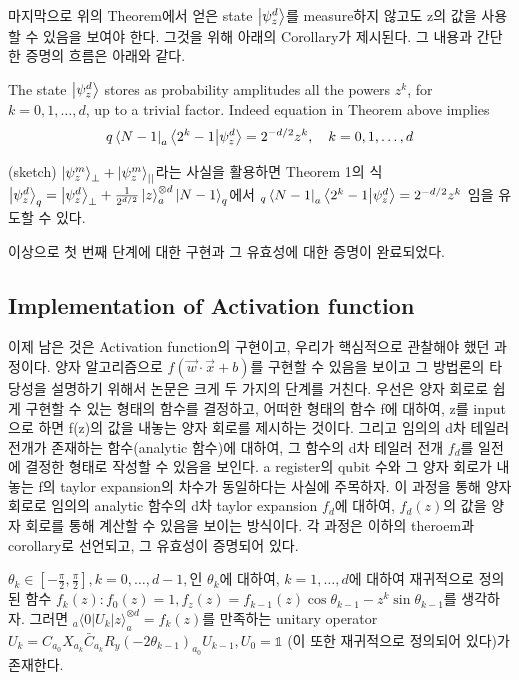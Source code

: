 마지막으로 위의 Theorem에서 얻은 state \(\ket{\psi_z^d}\)를 measure하지 않고도 z의 값을 사용할 수 있음을 보여야 한다.
그것을 위해 아래의 Corollary가 제시된다. 그 내용과 간단한 증명의 흐름은 아래와 같다.

\begin{corollary}
    The state $\ket{\psi_z^d}$ stores as probability amplitudes all the powers $z^k$, for $k = 0, 1, \ldots, d$, up to a trivial factor. Indeed equation in Theorem above implies
\[
q \bra{N - 1}_a \bra{2^k - 1} \ket{\psi_z^d} = 2^{-d/2} z^k, \quad k = 0, 1, \ldots, d
\]
\end{corollary}

\begin{pf}(sketch)
    \(\ket{\psi_z^m}_\perp + \ket{\psi_z^m}_{||}\)라는 사실을 활용하면
    Theorem 1의 식 \(\ket{\psi_z^d}_q = \ket{\psi_z^d}_\perp + \frac{1}{2^{d/2}}\ket{z}_a^{\otimes d}\ket{N-1}_q\)에서 \(_q\bra{N-1}_a\bra{2^k-1}\ket{\psi_z^d} = 2^{-d/2}z^k\) 임을 유도할 수 있다.
\end{pf}

이상으로 첫 번째 단계에 대한 구현과 그 유효성에 대한 증명이 완료되었다.

\subsection{Implementation of Activation function}

이제 남은 것은 Activation function의 구현이고, 우리가 핵심적으로 관찰해야 했던 과정이다.
양자 알고리즘으로 \(f(\vec{w}\cdot\vec{x}+b)\)를 구현할 수 있음을 보이고 그 방법론의 타당성을 설명하기 위해서 논문은 크게 두 가지의 단계를 거친다.
우선은 양자 회로로 쉽게 구현할 수 있는 형태의 함수를 결정하고,
어떠한 형태의 함수 f에 대하여, z를 input으로 하면 f(z)의 값을 내놓는 양자 회로를 제시하는 것이다.
그리고 임의의 d차 테일러 전개가 존재하는 함수(analytic 함수)에 대하여, 그 함수의 d차 테일러 전개 \(f_d\)를 일전에 결정한 형태로 작성할 수 있음을 보인다.
a register의 qubit 수와 그 양자 회로가 내놓는 f의 taylor expansion의 차수가 동일하다는 사실에 주목하자.
이 과정을 통해 양자 회로로 임의의 analytic 함수의 d차 taylor expansion \(f_d\)에 대하여, \(f_d(z)\)의 값을 양자 회로를 통해 계산할 수 있음을 보이는 방식이다.
각 과정은 이하의 theroem과 corollary로 선언되고, 그 유효성이 증명되어 있다.

\begin{theorem}
    \(\theta_{k} \in [-\frac{\pi}{2},\frac{\pi}{2}], k = 0,\dots,d-1,\)인 \(\theta_{k}\)에 대하여, \(k = 1,\dots,d\)에 대하여 재귀적으로 정의된 함수 \(f_k(z): f_0(z) = 1, f_z(z) = f_{k-1}(z)\cos\theta_{k-1} - z^k\sin\theta_{k-1}\)를 생각하자.
    그러면 \(_a \langle  0|U_k|z \rangle  _a^{\otimes d} = f_k(z)\)를 만족하는 unitary operator \(U_k = C_{a_0}X_{a_k}\bar{C}_{a_k}R_y(-2\theta_{k-1})_{a_0}U_{k-1}, U_0 = \mathbb{1} \) (이 또한 재귀적으로 정의되어 있다)가 존재한다.
\end{theorem}


